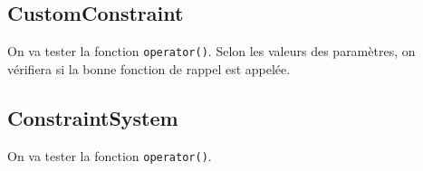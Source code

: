 


\subsection{CustomConstraint}

On va tester la fonction \texttt{operator()}. Selon les valeurs des paramètres, on vérifiera si la bonne fonction de rappel est appelée.

\subsection{ConstraintSystem}

On va tester la fonction \texttt{operator()}.

